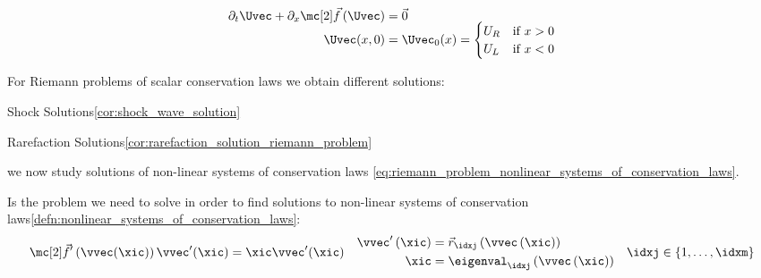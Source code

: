 \begin{defnbox}\nospacing
    \begin{defn}\label{defn:riemann_problem_for_non_linear_systems_of_conservations_laws}
            \begin{align}
              \begin{aligned}
                \partial_{t}\Uvec+\partial_{x}\fluxvec\left(\Uvec\right)&=\vec{0}\\[-2\jot]
                \Uvec(x,0)&=\Uvec_{0}(x)=\begin{cases}
                        U_{R}&\text{if }x>0 \\
                        U_{L}&\text{if }x<0
                \end{cases}
                \end{aligned}\label{eq:riemann_problem_nonlinear_systems_of_conservation_laws}
            \end{align}
        \end{defn}
\end{defnbox}
\begin{sectionbox}[Recall]\nospacing
    For Riemann problems of scalar conservation laws we obtain different solutions:
    \begin{circlelistnosep}
        \item Shock Solutions\cref{cor:shock_wave_solution}
        \item Rarefaction Solutions\cref{cor:rarefaction_solution_riemann_problem}
    \end{circlelistnosep}
    we now study solutions of non-linear systems of conservation laws \cref{eq:riemann_problem_nonlinear_systems_of_conservation_laws}.
\end{sectionbox}
\begin{defnbox}\nospacing
    \begin{defn}\label{defn:eigenvalue_problem_non-lin._sys._of_con.s_laws}
        Is the problem we need to solve in order to find solutions to non-linear systems of conservation laws\cref{defn:nonlinear_systems_of_conservation_laws}:
        \begin{align}
          \fluxvec'\left(\vvec(\xic)\right)\vvec'(\xic)=\xic\vvec'(\xic)&&
          \begin{aligned}
                \vvec'\left(\xic\right)&=\vec{r}_{\idxj}\left(\vvec\left(\xic\right)\right)\\
                \xic&=\eigenval_{\idxj}\left(\vvec\left(\xic\right)\right)
          \end{aligned}&&\idxj\in \left\{1,\ldots,\idxm\right\}\label{eq:eigenvalue_problem_simple_solutions}
        \end{align}
    \end{defn}
\end{defnbox}
